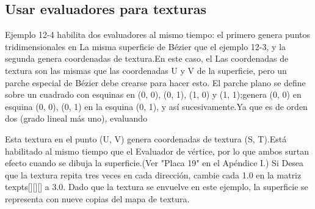 \documentclass[]{article}
\begin{document}



\subsection*{Usar evaluadores para texturas}


Ejemplo 12-4 habilita dos evaluadores al mismo tiempo: el primero genera puntos tridimensionales en
La misma superficie de Bézier que el ejemplo 12-3, y la segunda genera coordenadas de textura.En este caso, el
Las coordenadas de textura son las mismas que las coordenadas U y V de la superficie, pero un parche especial de Bézier
debe crearse para hacer esto.
El parche plano se define sobre un cuadrado con esquinas en (0, 0), (0, 1), (1, 0) y (1, 1);genera (0, 0) en
esquina (0, 0), (0, 1) en la esquina (0, 1), y así sucesivamente.Ya que es de orden dos (grado lineal más uno), evaluando

Esta textura en el punto (U, V) genera coordenadas de textura (S, T).Está habilitado al mismo tiempo que el
Evaluador de vértice, por lo que ambos surtan efecto cuando se dibuja la superficie.(Ver "Placa 19" en el Apéndice I.) Si
Desea que la textura repita tres veces en cada dirección, cambie cada 1.0 en la matriz texpts[][][] a 3.0.
Dado que la textura se envuelve en este ejemplo, la superficie se representa con nueve copias del mapa de textura.




\end{document}
